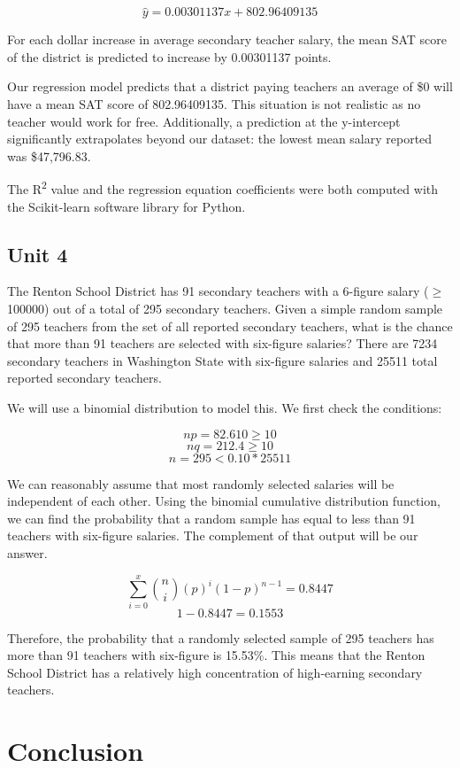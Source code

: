 \documentclass[11pt]{article} %
\begin{document}
\[\hat{y}=0.00301137x + 802.96409135\]

For each dollar increase in average secondary teacher salary, the mean SAT score of the district is predicted to increase by 0.00301137 points.

Our regression model predicts that a district paying teachers an average of \$0 will have a mean SAT score of 802.96409135. This situation is not realistic as no teacher would work for free. Additionally, a prediction at the y-intercept significantly extrapolates beyond our dataset: the lowest mean salary reported was \$47,796.83.

The R\textsuperscript{2} value and the regression equation coefficients were both computed with the Scikit-learn software library for Python.

\subsection{Unit 4}

The Renton School District has 91 secondary teachers with a 6-figure salary ($\geq$100000) out of a total of 295 secondary teachers. Given a simple random sample of 295 teachers from the set of all reported secondary teachers, what is the chance that more than 91 teachers are selected with six-figure salaries? There are 7234 secondary teachers in Washington State with six-figure salaries and 25511 total reported secondary teachers. 

We will use a binomial distribution to model this. We first check the conditions:

\[ np=82.610\geq10 \]
\[ nq=212.4\geq10 \]
\[ n=295<0.10*25511 \]

We can reasonably assume that most randomly selected salaries will be independent of each other. Using the binomial cumulative distribution function, we can find the probability that a random sample has equal to less than 91 teachers with six-figure salaries. The complement of that output will be our answer.

\[ \sum_{i=0}^{x} \binom{n}{i}(p)^i(1-p)^{n-1}=0.8447 \]
\[ 1-0.8447=0.1553 \]

Therefore, the probability that a randomly selected sample of 295 teachers has more than 91 teachers with six-figure is 15.53\%. This means that the Renton School District has a relatively high concentration of high-earning secondary teachers.

\section{Conclusion}
\end{document}
